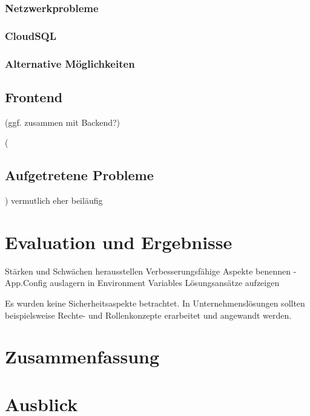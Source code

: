 \documentclass[pdftex,a4paper,abstracton,11pt,parskip=half,bibtotocnumbered]{scrartcl}
\begin{document}
		\subsubsection{Netzwerkprobleme}
		
		\subsubsection{CloudSQL}
		
		\subsubsection{Alternative Möglichkeiten}
	\subsection{Frontend} (ggf. zusammen mit Backend?)

	(\subsection{Aufgetretene Probleme}) vermutlich eher beiläufig

\section{Evaluation und Ergebnisse}
	Stärken und Schwächen herausstellen
	Verbesserungsfähige Aspekte benennen 
		- App.Config auslagern in Environment Variables
	Lösungsansätze aufzeigen

	Es wurden keine Sicherheitsaspekte betrachtet. In Unternehmenslösungen sollten beispielsweise Rechte- und Rollenkonzepte erarbeitet und angewandt werden.
\section{Zusammenfassung}

\section{Ausblick}

%

\printbibliography
\end{document}
